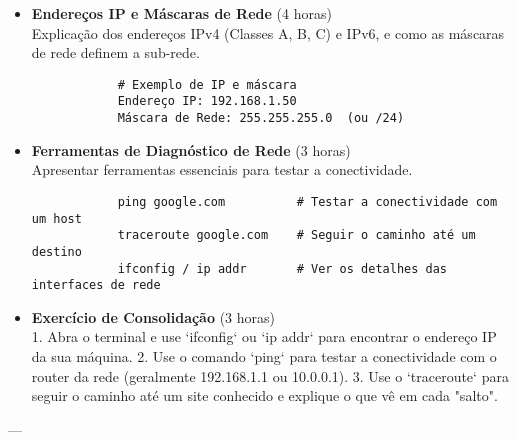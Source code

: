 \documentclass[10pt,a4paper]{article}
\newcommand{\guia}[1]{\textcolor{darkblue}{#1}} %
\begin{document}
	\begin{itemize}
		\item \textbf{Endereços IP e Máscaras de Rede} (4 horas) \\
		Explicação dos endereços IPv4 (Classes A, B, C) e IPv6, e como as máscaras de rede definem a sub-rede.
		\begin{verbatim}
			# Exemplo de IP e máscara
			Endereço IP: 192.168.1.50
			Máscara de Rede: 255.255.255.0  (ou /24)
		\end{verbatim}
		
		\item \textbf{Ferramentas de Diagnóstico de Rede} (3 horas) \\
		Apresentar ferramentas essenciais para testar a conectividade.
		\begin{verbatim}
			ping google.com          # Testar a conectividade com um host
			traceroute google.com    # Seguir o caminho até um destino
			ifconfig / ip addr       # Ver os detalhes das interfaces de rede
		\end{verbatim}
		
		\item \textbf{Exercício de Consolidação} (3 horas) \\
		1. Abra o terminal e use `ifconfig` ou `ip addr` para encontrar o endereço IP da sua máquina.
		2. Use o comando `ping` para testar a conectividade com o router da rede (geralmente 192.168.1.1 ou 10.0.0.1).
		3. Use o `traceroute` para seguir o caminho até um site conhecido e explique o que vê em cada "salto".
	\end{itemize}
	
	---
	
	\guia{
	}
\end{document}
